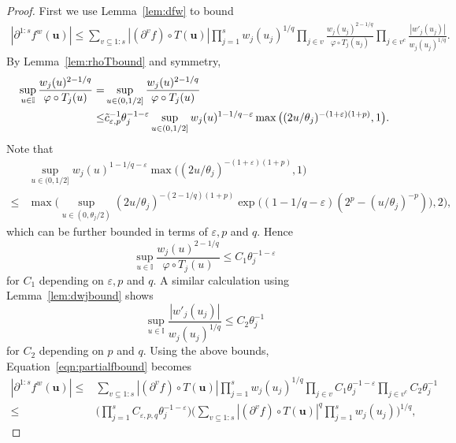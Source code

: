 \documentclass[10pt,a4paper]{amsart}
\newcommand{\bsu}{\boldsymbol{u}}
\newcommand{\itr}{\mathbb{I}}
\newcommand{\tc}{\Tilde{c}}
\begin{document}
\begin{proof}
    First we use Lemma~\ref{lem:dfw} to bound
    \begin{align}\label{eqn:partialfbound}
        |\partial^{1{:}s} f^w (\bsu)|\leq \sum_{v\subseteq 1{:}s}|(\partial^{v} f) \circ T(\bsu)| \prod_{j=1}^s w_j(u_j)^{1/q}\prod_{j\in v} \frac{w_j(u_j)^{2-1/q}}{\varphi\circ T_j(u_j)}\prod_{j\in v^c} \frac{|w'_j(u_j)|}{w_j(u_j)^{1/q}}.
    \end{align}
    By Lemma~\ref{lem:rhoTbound} and symmetry,
    \begin{align*}
        \sup_{u\in \itr }\frac{w_j(u)^{2-1/q}}{\varphi\circ T_j(u)}=&\sup_{u\in (0,1/2] }\frac{w_j(u)^{2-1/q}}{\varphi\circ T_j(u)}\\
        \leq &
       \tc^{-1}_{\varepsilon,p}  \theta^{-1-\varepsilon}_j\sup_{u\in (0,1/2] }w_{j}(u)^{1-1/q-\varepsilon}\max\big((2u/\theta_j)^{-(1+\varepsilon)(1+p)},1\big).
    \end{align*}
   Note that
   \begin{align*}
       &\sup_{u\in (0,1/2] }w_{j}(u)^{1-1/q-\varepsilon}\max\big((2u/\theta_j)^{-(1+\varepsilon)(1+p)},1\big)\\
       \leq & \max\Big(\sup_{u\in (0,\theta_j/2)}(2u/\theta_j)^{-(2-1/q)(1+p)}\exp\Big((1-1/q-\varepsilon)(2^p-(u/\theta_j)^{-p})\Big), 2\Big),
   \end{align*}
   which can be further bounded in terms of $\varepsilon,p$ and $q$. Hence
   \begin{equation}\label{eqn:woverphi}
      \sup_{u\in \itr }\frac{w_j(u)^{2-1/q}}{\varphi\circ T_j(u)}\leq C_1\theta^{-1-\varepsilon}_j 
   \end{equation}
   for $C_1$ depending on $\varepsilon,p$ and $q$. A similar calculation using Lemma~\ref{lem:dwjbound} shows
   \begin{equation}\label{eqn:dw}
       \sup_{u\in \itr } \frac{|w'_j(u_j)|}{w_j(u_j)^{1/q}} \leq C_2 \theta^{-1}_j
   \end{equation}
   for $C_2$ depending on $p$ and $q$. Using the above bounds, Equation~\eqref{eqn:partialfbound} becomes
   \begin{align*}
        |\partial^{1{:}s} f^w (\bsu)|\leq &\sum_{v\subseteq 1{:}s}|(\partial^{v} f) \circ T(\bsu)| \prod_{j=1}^s w_j(u_j)^{1/q} \prod_{j\in v} C_1\theta^{-1-\varepsilon}_j\prod_{j\in v^c} C_2\theta^{-1}_j\\
        \leq &  \Big(\prod_{j=1}^sC_{\varepsilon,p,q}\theta^{-1-\varepsilon}_j\Big) \Big(\sum_{v\subseteq 1{:}s}|(\partial^{v} f) \circ T(\bsu)|^q \prod_{j=1}^s w_j(u_j)\Big)^{1/q},

\end{align*}
\end{proof}
\end{document}
